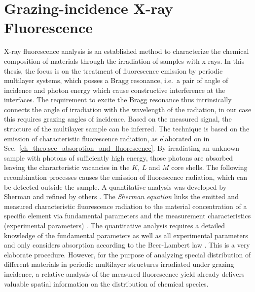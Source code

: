 \section{Grazing-incidence X-ray Fluorescence} \label{ch_theo:sec_xrf}
X-ray fluorescence analysis is an established method to characterize the chemical composition of materials through the irradiation of samples with x-rays. In this thesis, the focus is on the treatment of fluorescence emission by periodic multilayer systems, which posses a Bragg resonance, i.e.~a pair of angle of incidence and photon energy which cause constructive interference at the interfaces. The requirement to excite the Bragg resonance thus intrinsically connects the angle of irradiation with the wavelength of the radiation, in our case this requires grazing angles of incidence. Based on the measured signal, the structure of the multilayer sample can be inferred. The technique is based on the emission of characteristic fluorescence radiation, as elaborated on in Sec.~\ref{ch_theo:sec_absorption_and_fluorescence}. By irradiating an unknown sample with photons of sufficiently high energy, those photons are absorbed leaving the characteristic vacancies in the $K$, $L$ and $M$ core shells. The following recombination processes causes the emission of fluorescence radiation, which can be detected outside the sample. A quantitative analysis was developed by Sherman \cite{sherman_theoretical_1955} and refined by others \cite{shiraiwa_theoretical_1966, criss_calculation_1968, rasberry_calibration_1974}. The \emph{Sherman equation} links the emitted and measured characteristic fluorescence radiation to the material concentration of a specific element via fundamental parameters and the measurement characteristics (experimental parameters) \cite{rousseau_fundamental_1984}. The quantitative analysis requires a detailed knowledge of the fundamental parameters as well as all experimental parameters and only considers absorption according to the Beer-Lambert law \cite{als-nielsen_x-rays_2011}. This is a very elaborate procedure. However, for the purpose of analyzing special distribution of different materials in periodic multilayer structures irradiated under grazing incidence, a relative analysis of the measured fluorescence yield already delivers valuable spatial information on the distribution of chemical species.

